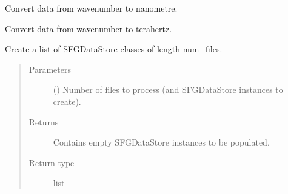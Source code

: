\documentclass[a4paper,10pt,english]{sphinxmanual}
\begin{document}
\begin{fulllineitems}
\begin{fulllineitems}
\label{\detokenize{sfgtools:sfgtools.SFGProcessTools.cm_to_nm}}
\sphinxAtStartPar
Convert data from wavenumber to nanometre.

\end{fulllineitems}


\begin{fulllineitems}
\label{\detokenize{sfgtools:sfgtools.SFGProcessTools.cm_to_thz}}
\sphinxAtStartPar
Convert data from wavenumber to terahertz.

\end{fulllineitems}


\begin{fulllineitems}
\label{\detokenize{sfgtools:sfgtools.SFGProcessTools.create_data_stores}}
\sphinxAtStartPar
Create a list of SFGDataStore classes of length num\_files.
\begin{quote}\begin{description}
\item[{Parameters}] \leavevmode
\sphinxAtStartPar
{} () \textendash{} Number of files to process (and SFGDataStore instances to create).

\item[{Returns}] \leavevmode
\sphinxAtStartPar
{} \textendash{} Contains empty SFGDataStore instances to be populated.

\item[{Return type}] \leavevmode
\sphinxAtStartPar
list

\end{description}\end{quote}

\end{fulllineitems}


\end{fulllineitems}
\end{document}
